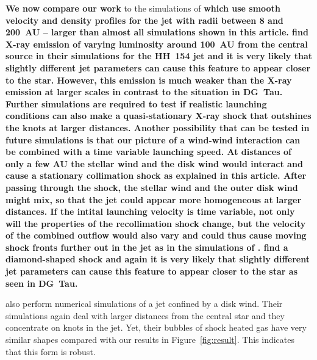 \textbf{We now compare our work} to the simulations of \citet{2010A&A...511A..42B,2010A&A...517A..68B} \textbf{which use smooth velocity and density profiles for the jet with radii between 8 and 200~AU -- larger than almost all simulations shown in this article.  \citet{2010A&A...517A..68B} find X-ray emission of varying luminosity around 100~AU from the central source in their simulations for the HH~154 jet and it is very likely that slightly different jet parameters can cause this feature to appear closer to the star. However, this emission is much weaker than the X-ray emission at larger scales in contrast to the situation in DG~Tau. Further simulations are required to test if realistic launching conditions can also make a quasi-stationary X-ray shock that outshines the knots at larger distances. Another possibility that can be tested in future simulations is that our picture of a wind-wind interaction can be combined with a time variable launching speed. At distances of only a few AU the stellar wind and the disk wind would interact and cause a stationary collimation shock as explained in this article. After passing through the shock, the stellar wind and the outer disk wind might mix, so that the jet could appear more homogeneous at larger distances. If the intital launching velocity is time variable, not only will the properties of the recollimation shock change, but the velocity of the combined outflow would also vary and could thus cause moving shock fronts further out in the jet as in the simulations of \citet{2010A&A...511A..42B,2010A&A...517A..68B}.
\citet{2011ApJ...737...54B} find a diamond-shaped shock and again it is very likely that slightly different jet parameters can cause this feature to appear closer to the star as seen in DG~Tau. }

\citet{2009A&A...502..217M,2012A&A...545A..53M} also perform numerical simulations of a jet confined by a disk wind. Their simulations again deal with larger distances from the central star and they concentrate on knots in the jet. Yet, their bubbles of shock heated gas have very similar shapes compared with our results in Figure~\ref{fig:result}. This indicates that this form is robust. 


